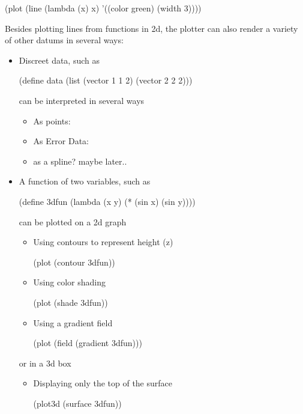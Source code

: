 \documentclass{article}
\begin{document}
{\begin{schemedisplay}
(plot 
 (line 
  (lambda (x) x) 
  '((color green) (width 3))))
      
\end{schemedisplay}



Besides plotting lines from functions in 2d, the plotter
      can also render a variety of other datums
      in several ways:\begin{itemize}
\item 
Discreet data, such as
\begin{schemedisplay}

(define data 
 (list 
  (vector 1 1 2) 
  (vector 2 2 2)))
\end{schemedisplay}
can be interpreted in several ways\begin{itemize}
\item As points: 
\end{itemize}
\begin{itemize}
\item As Error Data: 
\end{itemize}
\begin{itemize}
\item as a spline? maybe later..
\end{itemize}



\item 
A function of two variables, such as
\begin{schemedisplay}
(define 3dfun (lambda (x y) (* (sin x) (sin y))))
\end{schemedisplay}
can be plotted on a 2d graph\begin{itemize}
\item Using contours to represent height (z)
\begin{schemedisplay}
(plot (contour 3dfun))
\end{schemedisplay}

\item Using color shading
\begin{schemedisplay}
(plot (shade 3dfun))
\end{schemedisplay}

\item Using a gradient field
\begin{schemedisplay}
(plot (field (gradient 3dfun)))
\end{schemedisplay}

\end{itemize}
or in a 3d box\begin{itemize}
\item Displaying only the top of the surface
\begin{schemedisplay}
(plot3d (surface 3dfun))
\end{schemedisplay}


\end{itemize}
\end{itemize}}
\end{document}
